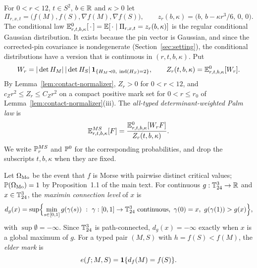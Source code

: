 \begin{definition}\label{def:selection-palm}
For $0<r<12$, $t\in S^2$, $b\in\mathbb R$ and $\kappa>0$ let
\[
\Pi_{r,x,t}=\bigl(f(M),f(S),\nabla f(M),\nabla f(S)\bigr),\qquad z_r(b,\kappa)=\bigl(b,\,b-\kappa r^3/6,\,0,\,0\bigr).
\]
The conditional law $\mathbb E^0_{r,t,b,\kappa}[\,\cdot\,]=\mathbb E[\,\cdot\mid\Pi_{r,x,t}=z_r(b,\kappa)]$ is the regular conditional Gaussian distribution. It exists because the pin vector is Gaussian, and since the corrected-pin covariance is nondegenerate (Section~\ref{sec:setting}), the conditional distributions have a version that is continuous in $(r,t,b,\kappa)$. Put
\[
W_r=|\det H_M|\,|\det H_S|\,\mathbf 1_{\{H_M\prec0,\ \operatorname{ind}(H_S)=2\}},\qquad Z_r(t,b,\kappa)=\mathbb E^0_{r,t,b,\kappa}[W_r].
\]
By Lemma~\ref{lem:contact-normalizer}, $Z_r>0$ for $0<r<12$, and $c_Zr^2\le Z_r\le C_Zr^2$ on a compact positive mark set for $0<r\le r_0$ of Lemma~\ref{lem:contact-normalizer}(iii). The \emph{all-typed determinant-weighted Palm law} is
\begin{equation}\label{eq:selection-palm}
\mathbb E^{MS}_{r,t,b,\kappa}[F]=\frac{\mathbb E^0_{r,t,b,\kappa}[W_rF]}{Z_r(t,b,\kappa)} .
\end{equation}
We write $\mathbb P^{MS}_r$ and $\mathbb P^0$ for the corresponding probabilities, and drop the subscripts $t,b,\kappa$ when they are fixed.
\end{definition}

\begin{definition}\label{def:selection-mark}
Let $\Omega_{\rm Mo}$ be the event that $f$ is Morse with pairwise distinct critical values; $\mathbb P(\Omega_{\rm Mo})=1$ by Proposition~1.1 of the main text. For continuous $g:\mathbb T^3_{24}\to\mathbb R$ and $x\in\mathbb T^3_{24}$, the \emph{maximin connection level} of $x$ is
\begin{equation}\label{eq:selection-connection}
d_g(x)=\sup\Bigl\{\min_{s\in[0,1]}g(\gamma(s))\ :\ \gamma:[0,1]\to\T^3_{24}\ \text{continuous},\ \gamma(0)=x,\ g(\gamma(1))>g(x)\Bigr\},
\end{equation}
with $\sup\emptyset=-\infty$. Since $\mathbb T^3_{24}$ is path-connected, $d_g(x)=-\infty$ exactly when $x$ is a global maximum of $g$. For a typed pair $(M,S)$ with $h=f(S)<f(M)$, the \emph{elder mark} is
\begin{equation}\label{eq:selection-mark}
e(f;M,S)=\mathbf 1\{d_f(M)=f(S)\}.
\end{equation}
\end{definition}

